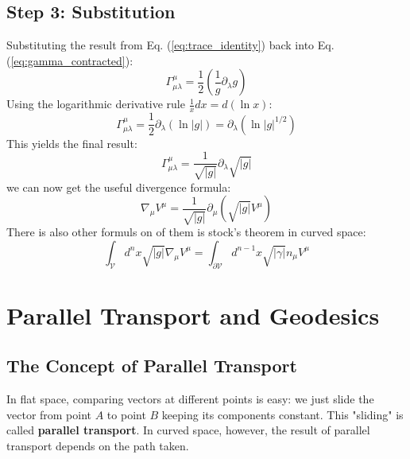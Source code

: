 \documentclass[11pt, a4paper]{report}
\begin{document}
\subsection*{Step 3: Substitution}
Substituting the result from Eq. (\ref{eq:trace_identity}) back into Eq. (\ref{eq:gamma_contracted}):
\begin{equation}
    \Gamma^\mu_{\mu\lambda} = \frac{1}{2} \left( \frac{1}{g} \partial_\lambda g \right)
\end{equation}
Using the logarithmic derivative rule $\frac{1}{x}dx = d(\ln x)$:
\begin{equation}
    \Gamma^\mu_{\mu\lambda} = \frac{1}{2} \partial_\lambda (\ln |g|) = \partial_\lambda (\ln |g|^{1/2})
\end{equation}
This yields the final result:
\begin{equation}
    \Gamma^\mu_{\mu\lambda} = \frac{1}{\sqrt{|g|}} \partial_\lambda \sqrt{|g|}
\end{equation}
we can now get the useful divergence formula:
\begin{equation}
    \nabla_\mu V^\mu = \frac{1}{\sqrt{|g|}} \partial_\mu (\sqrt{|g|} V^\mu)
\end{equation}
There is also other formuls on of them is stock's theorem in curved space:
\begin{equation}
    \int_{\mathcal{V}} d^n x \sqrt{|g|} \nabla_\mu V^\mu = \int_{\partial \mathcal{V}} d^{n-1} x \sqrt{|\gamma|} n_\mu V^\mu
\end{equation}
\section{Parallel Transport and Geodesics}

\subsection*{The Concept of Parallel Transport}
In flat space, comparing vectors at different points is easy: we just slide the vector from point \(A\) to point \(B\) keeping its components constant. This "sliding" is called \textbf{parallel transport}. In curved space, however, the result of parallel transport depends on the path taken.

\end{document}
